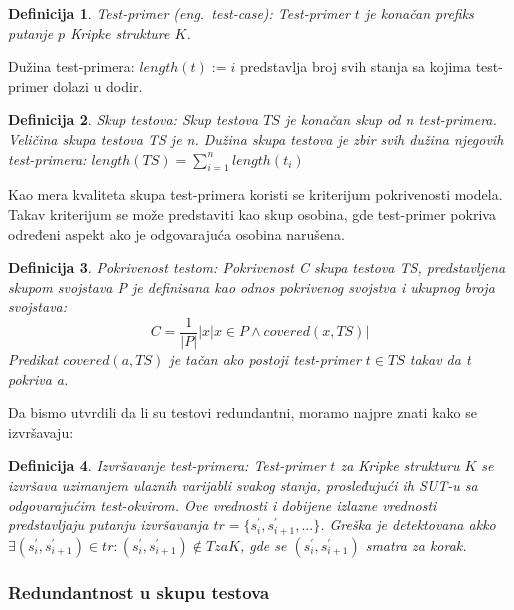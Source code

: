 \documentclass[a4paper]{article}
\newtheorem{definition}{Definicija}[section]
\begin{document}
\begin{definition}{Test-primer (eng.~{\textit test-case}):}
Test-primer $t$ je konačan prefiks putanje $p$ Kripke strukture $K$.
\end{definition}

Dužina test-primera: $ length(t) := i$ predstavlja broj svih stanja sa kojima test-primer dolazi u dodir.

\begin{definition}{Skup testova:}
Skup testova $TS$ je konačan skup od n test-primera. Veličina skupa testova TS je n. Dužina skupa testova je zbir svih dužina njegovih test-primera: $
    length(TS) = \sum_{i=1}^{n}length(t_i)$
\end{definition}

Kao mera kvaliteta skupa test-primera koristi se kriterijum pokrivenosti modela. Takav kriterijum se može predstaviti kao skup osobina, gde test-primer pokriva određeni aspekt ako je odgovarajuća osobina narušena.

\begin{definition}{Pokrivenost testom:}
Pokrivenost C skupa testova TS, predstavljena skupom svojstava P je definisana kao odnos pokrivenog svojstva i ukupnog broja svojstava:
\begin{equation}
    C = \frac{1}{|P|}|{x|x \in P \land covered(x,TS)}|
\end{equation}
Predikat $ covered(a, TS)$ je tačan ako postoji test-primer $ t \in TS$ takav da \textit{t} pokriva \textit{a}.
\end{definition}

Da bismo utvrdili da li su testovi redundantni, moramo najpre znati kako se izvršavaju:

\begin{definition}{Izvršavanje test-primera:}
Test-primer $t$ za Kripke strukturu $K$ se izvršava uzimanjem ulaznih varijabli svakog stanja, prosleđujući ih SUT-u sa odgovarajućim test-okvirom. Ove vrednosti i dobijene izlazne vrednosti predstavljaju putanju izvršavanja $ tr = \{s_{i}^{'}, s_{i+1}^{'}, ...\} $. Greška je detektovana akko $ \exists (s_{i}^{'}, s_{i+1}^{'}) \in tr : (s_{i}^{'}, s_{i+1}^{'}) \notin T za K $, gde se $ (s_{i}^{'}, s_{i+1}^{'})$ smatra za korak.
\end{definition}

\subsubsection{Redundantnost u skupu testova}
\label{subsubsec:redundantnost}
\end{document}
